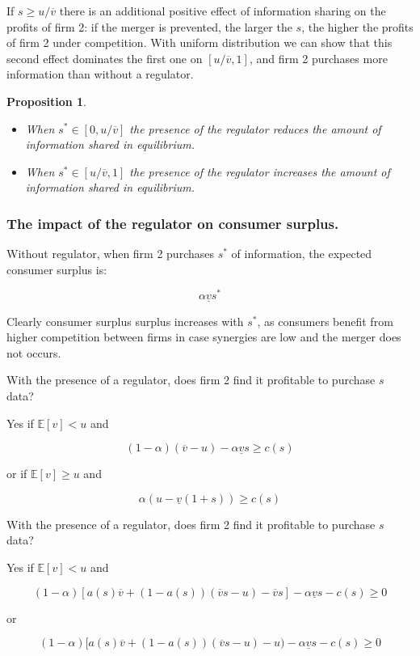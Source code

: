 \documentclass[a4paper,leqno]{article}%
\newtheorem{prop}{Proposition}
\newcommand{\E}{\mathbb E}
\renewcommand{\a}{\alpha}
\newcommand{\uv}{\underline{v}}
\newcommand{\ov}{\overline{v}}
\begin{document}
If $s\geq u/ \ov$ there is an additional positive effect of information sharing on the profits of firm 2: if the merger is prevented, the larger the $s$, the higher the profits of firm 2 under competition. With uniform distribution we can show that this second effect dominates the first one on $[u/\ov,1]$, and firm 2 purchases more information than without a regulator. 

\begin{prop}~~

\begin{itemize}
    \item When $s^*\in[0,u/\ov]$ the presence of the regulator reduces the amount  of information shared in equilibrium.
    \item When $s^*\in[u/\ov,1]$ the presence of the regulator increases the amount  of information shared in equilibrium.
\end{itemize}

\end{prop}


\subsubsection{The impact of the regulator on consumer surplus.}

Without regulator, when firm 2 purchases $s^*$ of information, the expected consumer surplus is:

\[
\a\uv s^*
\]

Clearly consumer surplus surplus increases with $s^*$, as consumers benefit from higher competition between firms in case synergies are low and the merger does not occurs.

\medskip

With the presence of a regulator, does firm 2 find it profitable to purchase $s$ data?

Yes if $\E[v]<u$ and

$$(1-\a)(\ov -u)-\a \uv s\geq c(s)$$

or if $\E[v]\geq u$ and

$$\a(u-\uv(1+s))\geq c(s)$$

With the presence of a regulator, does firm 2 find it profitable to purchase $s$ data?

Yes if $\E[v]<u$ and

$$(1-\a)[a(s)\ov+(1-a(s))(\ov s-u)-\ov s]-\a\uv s-c(s)\geq 0$$

or 

$$(1-\a)[a(s)\ov+(1-a(s))(\ov s-u)-u)-\a\uv s-c(s)\geq 0$$
\end{document}
